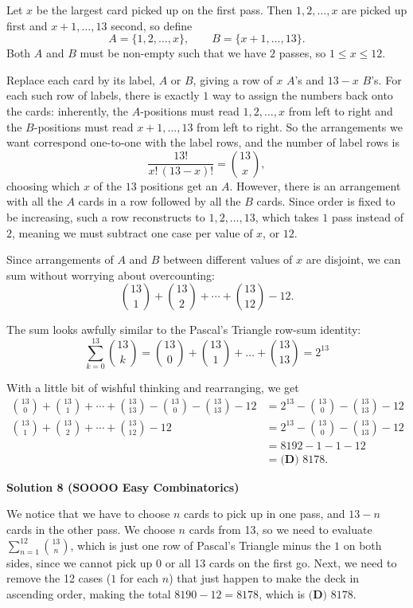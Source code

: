 \begin{enumerate}
Let $x$ be the largest card picked up on the first pass. Then $1, 2, \ldots, x$ are picked up first and $x+1, \ldots, 13$ second, so define
 \[A = \{1, 2, \ldots, x\}, \qquad B = \{x+1, \ldots, 13\}.\]Both $A$ and $B$ must be non-empty such that we have $2$ passes, so $1 \le x \le 12$.

 
Replace each card by its label, $A$ or $B$, giving a row of $x$ $A$'s and $13-x$ $B$'s. For each such row of labels, there is exactly $1$ way to assign the numbers back onto the cards: inherently, the $A$-positions must read $1, 2, \ldots, x$ from left to right and the $B$-positions must read $x+1, \ldots, 13$ from left to right. So the arrangements we want correspond one-to-one with the label rows, and the number of label rows is
 \[\frac{13!}{x!\,(13-x)!} = \binom{13}{x},\]choosing which $x$ of the $13$ positions get an $A$. However, there is an arrangement with all the $A$ cards in a row followed by all the $B$ cards. Since order is fixed to be increasing, such a row reconstructs to $1, 2, \ldots, 13$, which takes $1$ pass instead of $2$, meaning we must subtract one case per value of $x$, or $12$.

 
Since arrangements of $A$ and $B$ between different values of $x$ are disjoint, we can sum without worrying about overcounting:
 \[\binom{13}{1} + \binom{13}{2} + \cdots + \binom{13}{12} - 12.\]

 The sum looks awfully similar to the Pascal's Triangle row-sum identity:
 \[\sum_{k=0}^{13}\binom{13}{k} = \binom{13}{0} + \binom{13}{1} + \ldots + \binom{13}{13} = 2^{13}\]

 With a little bit of wishful thinking and rearranging, we get
 \begin{align*} \binom{13}{0} + \binom{13}{1} + \cdots + \binom{13}{13} - \binom{13}{0} - \binom{13}{13} - 12 &= 2^{13} - \binom{13}{0} - \binom{13}{13} - 12 \\ \binom{13}{1} + \binom{13}{2} + \cdots + \binom{13}{12} - 12 &= 2^{13} - \binom{13}{0} - \binom{13}{13} - 12 \\ &= 8192 - 1 - 1 - 12 \\ &= \boxed{\textbf{(D) } 8178}. \end{align*}





\textbf{Solution 8 (SOOOO Easy Combinatorics)}

We notice that we have to choose $n$ cards to pick up in one pass, and $13-n$ cards in the other pass. We choose $n$ cards from 13, so we need to evaluate $\sum_{n=1}^{12}{\binom{13}{n}}$, which is just one row of Pascal's Triangle minus the $1$ on both sides, since we cannot pick up 0 or all 13 cards on the first go. Next, we need to remove the 12 cases ($1$ for each $n$) that just happen to make the deck in ascending order, making the total $8190-12=8178$, which is $\boxed{\textbf{(D) } 8178}$.


\end{enumerate}
